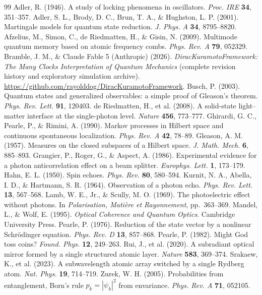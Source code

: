 \documentclass[11pt,a4paper]{article}
\begin{document}
\begin{thebibliography}{99}
\small
{} Adler, R. (1946). A study of locking phenomena in oscillators. \emph{Proc. IRE} \textbf{34}, 351--357.
 Adler, S. L., Brody, D. C., Brun, T. A., \& Hughston, L. P. (2001). Martingale models for quantum state reduction. \emph{J. Phys. A} \textbf{34}, 8795--8820.
 Afzelius, M., Simon, C., de Riedmatten, H., \& Gisin, N. (2009). Multimode quantum memory based on atomic frequency combs. \emph{Phys. Rev. A} \textbf{79}, 052329.
 Bramble, J. M., \& Claude Fable 5 (Anthropic) (2026). \emph{DiracKuramotoFramework: The Many Clocks Interpretation of Quantum Mechanics} (complete revision history and exploratory simulation archive). \url{https://github.com/rayolddog/DiracKuramotoFramework}.
 Busch, P. (2003). Quantum states and generalized observables: a simple proof of Gleason's theorem. \emph{Phys. Rev. Lett.} \textbf{91}, 120403.
 de Riedmatten, H., et al. (2008). A solid-state light--matter interface at the single-photon level. \emph{Nature} \textbf{456}, 773--777.
 Ghirardi, G. C., Pearle, P., \& Rimini, A. (1990). Markov processes in Hilbert space and continuous spontaneous localization. \emph{Phys. Rev. A} \textbf{42}, 78--89.
 Gleason, A. M. (1957). Measures on the closed subspaces of a Hilbert space. \emph{J. Math. Mech.} \textbf{6}, 885--893.
 Grangier, P., Roger, G., \& Aspect, A. (1986). Experimental evidence for a photon anticorrelation effect on a beam splitter. \emph{Europhys. Lett.} \textbf{1}, 173--179.
 Hahn, E. L. (1950). Spin echoes. \emph{Phys. Rev.} \textbf{80}, 580--594.
 Kurnit, N. A., Abella, I. D., \& Hartmann, S. R. (1964). Observation of a photon echo. \emph{Phys. Rev. Lett.} \textbf{13}, 567--568.
 Lamb, W. E., Jr., \& Scully, M. O. (1969). The photoelectric effect without photons. In \emph{Polarisation, Mati\`ere et Rayonnement}, pp.\ 363--369.
 Mandel, L., \& Wolf, E. (1995). \emph{Optical Coherence and Quantum Optics}. Cambridge University Press.
 Pearle, P. (1976). Reduction of the state vector by a nonlinear Schr\"odinger equation. \emph{Phys. Rev. D} \textbf{13}, 857--868.
 Pearle, P. (1982). Might God toss coins? \emph{Found. Phys.} \textbf{12}, 249--263.
 Rui, J., et al. (2020). A subradiant optical mirror formed by a single structured atomic layer. \emph{Nature} \textbf{583}, 369--374.
 Srakaew, K., et al. (2023). A subwavelength atomic array switched by a single Rydberg atom. \emph{Nat. Phys.} \textbf{19}, 714--719.
 Zurek, W. H. (2005). Probabilities from entanglement, Born's rule $p_k = |\psi_k|^2$ from envariance. \emph{Phys. Rev. A} \textbf{71}, 052105.
\end{thebibliography}
\end{document}
